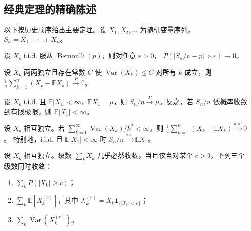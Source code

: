 \subsection{经典定理的精确陈述}

以下按历史顺序给出主要定理。设 $X_1, X_2, \dots$ 为随机变量序列，$S_n = X_1 + \cdots + X_n$。

\begin{theorem}[伯努利，1713]\label{thm:bernoulli}
    设 $X_k$ i.i.d. 服从 $\operatorname{Bernoulli}(p)$，则对任意 $\varepsilon > 0$，
    $P\left(\left|S_n/n - p\right| > \varepsilon\right) \to 0$。
\end{theorem}

\begin{theorem}[切比雪夫，1866]\label{thm:chebyshev}
    设 $X_k$ 两两独立且存在常数 $C$ 使 $\operatorname{Var}(X_k) \leq C$ 对所有 $k$ 成立，则
    $\frac{1}{n}\sum_{k=1}^n \left(X_k - \mathbb{E}X_k\right) \xrightarrow{P} 0$。
\end{theorem}

\begin{theorem}[辛钦，1929]\label{thm:khinchin}
    设 $X_k$ i.i.d. 且 $\mathbb{E}|X_1| < \infty$，$\mathbb{E}X_1 = \mu$，则
    $S_n/n \xrightarrow{P} \mu$。反之，若 $S_n/n$ 依概率收敛到有限极限，则 $\mathbb{E}|X_1| < \infty$。
\end{theorem}

\begin{theorem}[科尔莫哥洛夫，1930]\label{thm:kolmogorov-slln}
    设 $X_k$ 相互独立。若 $\sum_{k=1}^{\infty} \operatorname{Var}(X_k)/k^2 < \infty$，则
    $\frac{1}{n}\sum_{k=1}^n \left(X_k - \mathbb{E}X_k\right) \xrightarrow{a.s.} 0$。
    特别地，i.i.d. 且 $\mathbb{E}|X_1| < \infty$ 时 $S_n/n \xrightarrow{a.s.} \mathbb{E}X_1$。
\end{theorem}

\begin{theorem}[科尔莫哥洛夫三级数定理，1928]\label{thm:three-series}
    设 $X_k$ 相互独立。级数 $\sum_k X_k$ 几乎必然收敛，当且仅当对某个 $c > 0$，下列三个级数同时收敛：
    \begin{enumerate}[label=(\arabic*)]
        \item $\sum_k P(|X_k| \geq c)$；
        \item $\sum_k \mathbb{E}\left[X_k^{(c)}\right]$，其中 $X_k^{(c)} = X_k \mathbf{1}_{\{|X_k| < c\}}$；
        \item $\sum_k \operatorname{Var}\left(X_k^{(c)}\right)$。
    \end{enumerate}
\end{theorem}

